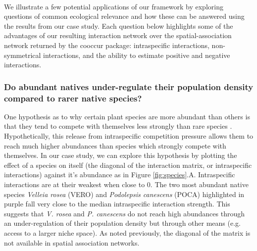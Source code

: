 \documentclass[a4,12pt]{article}
\begin{document}
    \paragraph{}
    We illustrate a few potential applications of our framework by exploring questions of common ecological relevance and how these can be answered using the results from our case study. Each question below highlights some of the advantages of our resulting interaction network over the spatial-association network returned by the cooccur package: intraspecific interactions, non-symmetrical interactions, and the ability to estimate positive and negative interactions. 


    \subsubsection*{Do abundant natives under-regulate their population density compared to rarer native species?}
    One hypothesis as to why certain plant species are more abundant than others is that they tend to compete with themselves less strongly than rare species \parencite{Yenni2012, Yenni2017}. Hypothetically, this release from intraspecific competition pressure allows them to reach much higher abundances than species which strongly compete with themselves. In our case study, we can explore this hypothesis by plotting the effect of a species on itself (the diagonal of the interaction matrix, or intraspecific interactions) against it's abundance as in Figure \ref{fig:species}.A. Intraspecific interactions are at their weakest when close to $0$. The two most abundant native species \textit{Velleia rosea} (VERO) and \textit{Podolepsis canescens} (POCA) highlighted in purple fall very close to the median intraspecific interaction strength. This suggests that \textit{V. rosea} and \textit{P. canescens} do not reach high abundances through an under-regulation of their population density but through other means (e.g. access to a larger niche space). As noted previously, the diagonal of the matrix is not available in spatial association networks.
\end{document}
